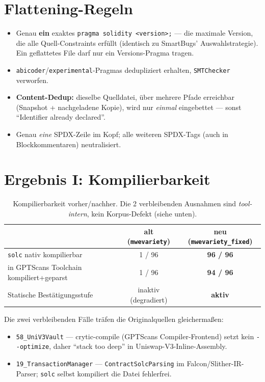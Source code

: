 \documentclass[11pt,a4paper]{scrartcl}
\newcommand{\code}[1]{\texttt{#1}}
\begin{document}
\section{Flattening-Regeln}
\begin{itemize}[leftmargin=1.4em]
  \item Genau \textbf{ein} exaktes \code{pragma solidity <version>;} --- die maximale
    Version, die alle Quell-Constraints erfüllt (identisch zu SmartBugs'
    Auswahlstrategie). Ein geflattetes File darf nur ein Versions-Pragma tragen.
  \item \code{abicoder}/\code{experimental}-Pragmas dedupliziert erhalten,
    \code{SMTChecker} verworfen.
  \item \textbf{Content-Dedup:} dieselbe Quelldatei, über mehrere Pfade erreichbar
    (Snapshot + nachgeladene Kopie), wird nur \emph{einmal} eingebettet --- sonst
    \enquote{Identifier already declared}.
  \item Genau \emph{eine} SPDX-Zeile im Kopf; alle weiteren SPDX-Tags (auch in
    Blockkommentaren) neutralisiert.
\end{itemize}

\section{Ergebnis I: Kompilierbarkeit}

\begin{table}[h]
\centering
\begin{tabular}{@{}lcc@{}}
\toprule
 & \textbf{alt (\code{mwevariety})} & \textbf{neu (\code{mwevariety\_fixed})} \\
\midrule
\code{solc} nativ kompilierbar        & 1 / 96 & \textcolor{good}{\textbf{96 / 96}} \\
in GPTScans Toolchain kompiliert+geparst & 1 / 96 & \textcolor{good}{\textbf{94 / 96}} \\
Statische Bestätigungsstufe            & inaktiv (degradiert) & \textcolor{good}{\textbf{aktiv}} \\
\bottomrule
\end{tabular}
\caption{Kompilierbarkeit vorher/nachher. Die 2 verbleibenden Ausnahmen sind
\emph{tool-intern}, kein Korpus-Defekt (siehe unten).}
\end{table}

\noindent Die zwei verbleibenden Fälle träfen die Originalquellen gleichermaßen:
\begin{itemize}[leftmargin=1.4em]
  \item \code{58\_UniV3Vault} --- crytic-compile (GPTScans Compiler-Frontend) setzt
    kein \code{-{}-optimize}, daher \enquote{stack too deep} in Uniswap-V3-Inline-Assembly.
  \item \code{19\_TransactionManager} --- \code{ContractSolcParsing} im
    Falcon/Slither-IR-Parser; \code{solc} selbst kompiliert die Datei fehlerfrei.
\end{itemize}
\end{document}
